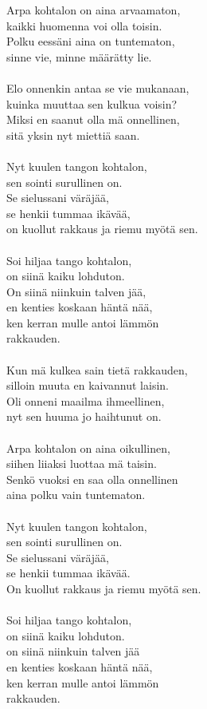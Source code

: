 
Arpa kohtalon on aina arvaamaton, \\ kaikki huomenna voi olla toisin. \\ Polku eessäni aina on tuntematon, \\ sinne vie, minne määrätty lie. \\ \hspace{10mm} \\ Elo onnenkin antaa se vie mukanaan, \\ kuinka muuttaa sen kulkua voisin? \\ Miksi en saanut olla mä onnellinen, \\ sitä yksin nyt miettiä saan. \\ \hspace{10mm} \\ Nyt kuulen tangon kohtalon, \\ sen sointi surullinen on. \\ Se sielussani väräjää, \\ se henkii tummaa ikävää, \\ on kuollut rakkaus ja riemu myötä sen. \\ \hspace{10mm} \\ Soi hiljaa tango kohtalon, \\ on siinä kaiku lohduton. \\ On siinä niinkuin talven jää, \\ en kenties koskaan häntä nää, \\ ken kerran mulle antoi lämmön \\ rakkauden. \\ \hspace{10mm} \\ Kun mä kulkea sain tietä rakkauden, \\ silloin muuta en kaivannut laisin. \\ Oli onneni maailma ihmeellinen, \\ nyt sen huuma jo haihtunut on. \\ \hspace{10mm} \\ Arpa kohtalon on aina oikullinen, \\ siihen liiaksi luottaa mä taisin. \\ Senkö vuoksi en saa olla onnellinen \\ aina polku vain tuntematon. \\ \hspace{10mm} \\ Nyt kuulen tangon kohtalon, \\ sen sointi surullinen on. \\ Se sielussani väräjää, \\ se henkii tummaa ikävää. \\ On kuollut rakkaus ja riemu myötä sen. \\ \hspace{10mm} \\ Soi hiljaa tango kohtalon, \\ on siinä kaiku lohduton. \\ on siinä niinkuin talven jää \\ en kenties koskaan häntä nää, \\ ken kerran mulle antoi lämmön \\ rakkauden.